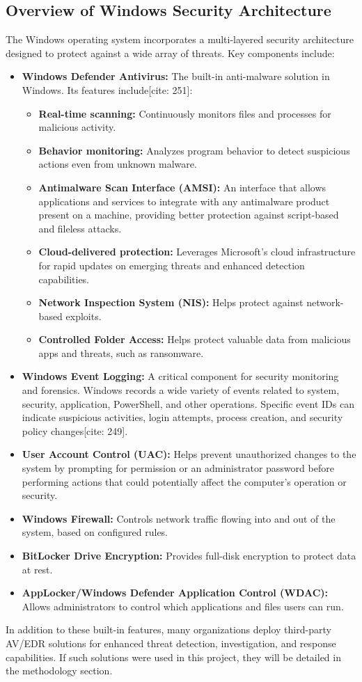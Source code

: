\documentclass[11pt]{article}
\begin{document}
	\subsection{Overview of Windows Security Architecture}
	The Windows operating system incorporates a multi-layered security architecture designed to protect against a wide array of threats. Key components include:
	\begin{itemize}
		\item \textbf{Windows Defender Antivirus:} The built-in anti-malware solution in Windows. Its features include[cite: 251]:
		\begin{itemize}
			\item \textbf{Real-time scanning:} Continuously monitors files and processes for malicious activity.
			\item \textbf{Behavior monitoring:} Analyzes program behavior to detect suspicious actions even from unknown malware.
			\item \textbf{Antimalware Scan Interface (AMSI):} An interface that allows applications and services to integrate with any antimalware product present on a machine, providing better protection against script-based and fileless attacks.
			\item \textbf{Cloud-delivered protection:} Leverages Microsoft's cloud infrastructure for rapid updates on emerging threats and enhanced detection capabilities.
			\item \textbf{Network Inspection System (NIS):} Helps protect against network-based exploits.
			\item \textbf{Controlled Folder Access:} Helps protect valuable data from malicious apps and threats, such as ransomware.
		\end{itemize}
		\item \textbf{Windows Event Logging:} A critical component for security monitoring and forensics. Windows records a wide variety of events related to system, security, application, PowerShell, and other operations. Specific event IDs can indicate suspicious activities, login attempts, process creation, and security policy changes[cite: 249].
		\item \textbf{User Account Control (UAC):} Helps prevent unauthorized changes to the system by prompting for permission or an administrator password before performing actions that could potentially affect the computer's operation or security.
		\item \textbf{Windows Firewall:} Controls network traffic flowing into and out of the system, based on configured rules.
		\item \textbf{BitLocker Drive Encryption:} Provides full-disk encryption to protect data at rest.
		\item \textbf{AppLocker/Windows Defender Application Control (WDAC):} Allows administrators to control which applications and files users can run.
	\end{itemize}
	In addition to these built-in features, many organizations deploy third-party AV/EDR solutions for enhanced threat detection, investigation, and response capabilities. If such solutions were used in this project, they will be detailed in the methodology section.
	
\end{document}
